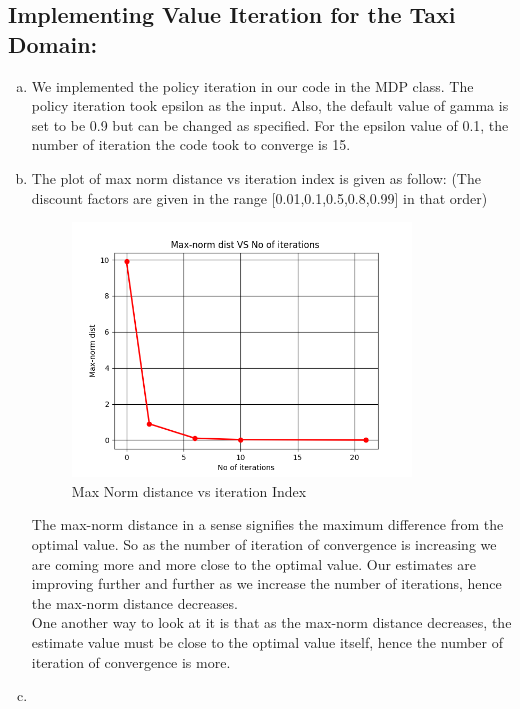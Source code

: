 \documentclass{article}
\begin{document}
\subsection{Implementing Value Iteration for the Taxi Domain:}
\begin{enumerate}[a)]
    \item We implemented the policy iteration in our code in the MDP class. The policy iteration took epsilon as the input. Also, the default value of gamma is set to be 0.9 but can be changed as specified. For the epsilon value of 0.1, the number of iteration the code took to converge is 15.
    \item The plot of max norm distance vs iteration index is given as follow: (The discount factors are given in the range [0.01,0.1,0.5,0.8,0.99] in that order)
    \begin{center}
        \begin{figure}[h]
\hfill\includegraphics[width=9cm]{QA2b.png}\hspace*{\fill}
        \caption{Max Norm distance vs iteration Index}
        \label{fig:Max Norm distance vs iteration Index}
\end{figure}
\end{center}
    The max-norm distance in a sense signifies the maximum difference from the optimal value. So as the number of iteration of convergence is increasing we are coming more and more close to the optimal value. Our estimates are improving further and further as we increase the number of iterations, hence the max-norm distance decreases. \\
    One another way to look at it is that as the max-norm distance decreases, the estimate value must be close to the optimal value itself, hence the number of iteration of convergence is more. 
    \item
\end{enumerate}
\end{document}
